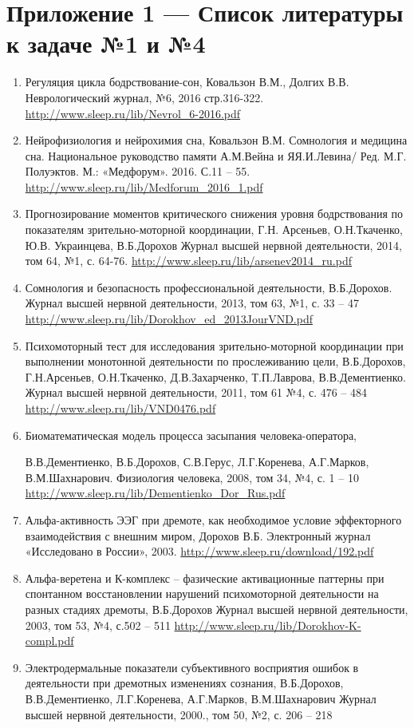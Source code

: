 \section*{Приложение 1 — Список литературы к задаче №1 и №4}

\begin{enumerate}
    \item Регуляция цикла бодрствование-сон, Ковальзон В.М., Долгих В.В. Неврологический журнал, №6, 2016 стр.316-322. 
    \url{http://www.sleep.ru/lib/Nevrol_6-2016.pdf}
    \item Нейрофизиология и нейрохимия сна, Ковальзон В.М. Сомнология и медицина сна. Национальное руководство памяти А.М.Вейна и ЯЯ.И.Левина/ Ред. М.Г. Полуэктов. М.: «Медфорум». 2016. С.11 – 55. 
    \url{http://www.sleep.ru/lib/Medforum_2016_1.pdf}
    \item Прогнозирование моментов критического снижения уровня бодрствования по показателям зрительно-моторной координации, Г.Н. Арсеньев, О.Н.Ткаченко, Ю.В. Украинцева, В.Б.Дорохов
    Журнал высшей нервной деятельности, 2014, том 64, №1, с. 64-76. 
    \url{http://www.sleep.ru/lib/arsenev2014_ru.pdf}
    \item Сомнология и безопасность профессиональной деятельности, В.Б.Дорохов. 
    Журнал высшей нервной деятельности, 2013, том 63, №1, с. 33 – 47
    \url{http://www.sleep.ru/lib/Dorokhov_ed_2013JourVND.pdf}
    \item Психомоторный тест для исследования зрительно-моторной координации при выполнении монотонной деятельности по прослеживанию цели, В.Б.Дорохов, Г.Н.Арсеньев, О.Н.Ткаченко, Д.В.Захарченко, Т.П.Лаврова, В.В.Дементиенко. 
    Журнал высшей нервной деятельности, 2011, том 61 №4, с. 476 – 484
    \url{http://www.sleep.ru/lib/VND0476.pdf}
    \item Биоматематическая модель процесса засыпания человека-оператора, 
    
    В.В.Дементиенко, В.Б.Дорохов, С.В.Герус, Л.Г.Коренева, А.Г.Марков, В.М.Шахнарович. Физиология человека, 2008, том 34, №4, с. 1 – 10
    \url{http://www.sleep.ru/lib/Dementienko_Dor_Rus.pdf}
    \item Альфа-активность ЭЭГ при дремоте, как необходимое условие эффекторного взаимодействия с внешним миром, Дорохов В.Б. Электронный журнал «Исследовано в России», 2003.
    \url{http://www.sleep.ru/download/192.pdf}
    \item Альфа-веретена и К-комплекс – фазические активационные паттерны при спонтанном восстановлении нарушений психомоторной деятельности на разных стадиях дремоты, В.Б.Дорохов
    Журнал высшей нервной деятельности, 2003, том 53, №4, с.502 – 511
    \url{http://www.sleep.ru/lib/Dorokhov-K-compl.pdf}
    \item Электродермальные показатели субъективного восприятия ошибок в деятельности при дремотных изменениях сознания, В.Б.Дорохов, В.В.Дементиенко, Л.Г.Коренева, А.Г.Марков, В.М.Шахнарович
    Журнал высшей нервной деятельности, 2000., том 50, №2, с. 206 – 218
    

\end{enumerate}
